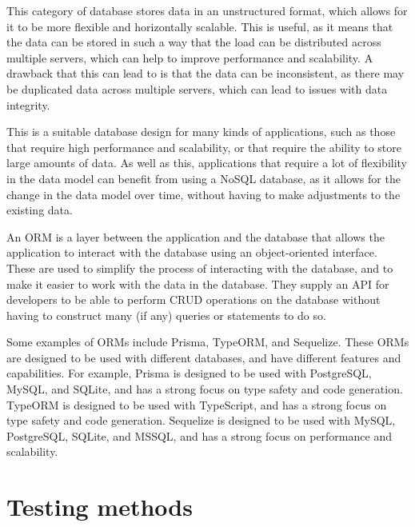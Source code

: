 \documentclass[11pt, a4paper,twoside]{report}
\theoremstyle{plain} %
\theoremstyle{definition} %
\numberwithin{equation}{chapter}
\begin{document}
\begin{description}
{        This category of database stores data in an unstructured format, which
        allows for it to be more flexible and horizontally scalable. This
        is useful, as it means that the data can be stored in such a way that
        the load can be distributed across multiple servers, which can help to
        improve performance and scalability. A drawback that this can lead to
        is that the data can be inconsistent, as there may be duplicated data
        across multiple servers, which can lead to issues with data integrity.

        This is a suitable database design for many kinds of applications, such
        as those that require high performance and scalability, or that require
        the ability to store large amounts of data. As well as this,
        applications that require a lot of flexibility in the data model can
        benefit from using a NoSQL database, as it allows for the change in the
        data model over time, without having to make adjustments to the
        existing data.
        }

\end{description}

An ORM is a layer between the application and the database that allows the
application to interact with the database using an object-oriented interface.
These are used to simplify the process of interacting with the database, and
to make it easier to work with the data in the database. They supply an API for
developers to be able to perform CRUD operations on the database without having
to construct many (if any) queries or statements to do so.

Some examples of ORMs include Prisma, TypeORM, and Sequelize. These ORMs are
designed to be used with different databases, and have different features and
capabilities. For example, Prisma is designed to be used with PostgreSQL,
MySQL, and SQLite, and has a strong focus on type safety and code generation.
TypeORM is designed to be used with TypeScript, and has a strong focus on type
safety and code generation. Sequelize is designed to be used with MySQL,
PostgreSQL, SQLite, and MSSQL, and has a strong focus on performance and
scalability.\cite{orms}

\section{Testing methods}\label{sec:testingmethods}
\end{document}
